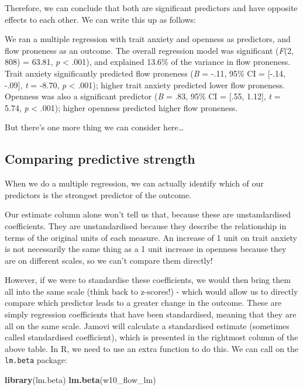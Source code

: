 \documentclass[
]{book}
\newenvironment{Shaded}{\begin{snugshade}}{\end{snugshade}}
\newcommand{\FunctionTok}[1]{\textcolor[rgb]{0.13,0.29,0.53}{\textbf{#1}}}
\newcommand{\NormalTok}[1]{#1}
\begin{document}
Therefore, we can conclude that both are significant predictors and have opposite effects to each other. We can write this up as follows:

We ran a multiple regression with trait anxiety and openness as predictors, and flow proneness as an outcome. The overall regression model was significant (\emph{F}(2, 808) = 63.81, \emph{p} \textless{} .001), and explained 13.6\% of the variance in flow proneness. Trait anxiety significantly predicted flow proneness (\emph{B} = -.11, 95\% CI = {[}-.14, -.09{]}, \emph{t} = -8.70, \emph{p} \textless{} .001); higher trait anxiety predicted lower flow proneness. Openness was also a significant predictor (\emph{B} = .83, 95\% CI = {[}.55, 1.12{]}, \emph{t} = 5.74, \emph{p} \textless{} .001); higher openness predicted higher flow proneness.

But there's one more thing we can consider here\ldots{}

\hypertarget{comparing-predictive-strength}{%
\subsection{Comparing predictive strength}\label{comparing-predictive-strength}}

When we do a multiple regression, we can actually identify which of our predictors is the strongest predictor of the outcome.

Our estimate column alone won't tell us that, because these are unstandardised coefficients. They are unstandardised because they describe the relationship in terms of the original units of each measure. An increase of 1 unit on trait anxiety is not necessarily the same thing as a 1 unit increase in openness because they are on different scales, so we can't compare them directly!

However, if we were to standardise these coefficients, we would then bring them all into the same scale (think back to z-scores!) - which would allow us to directly compare which predictor leads to a greater change in the outcome. These are simply regression coefficients that have been standardised, meaning that they are all on the same scale. Jamovi will calculate a standardised estimate (sometimes called standardised coefficient), which is presented in the rightmost column of the above table. In R, we need to use an extra function to do this. We can call on the \texttt{lm.beta} package:

\begin{Shaded}
\begin{Highlighting}[]
\FunctionTok{library}\NormalTok{(lm.beta)}
\FunctionTok{lm.beta}\NormalTok{(w10\_flow\_lm)}
\end{Highlighting}
\end{Shaded}
\end{document}

